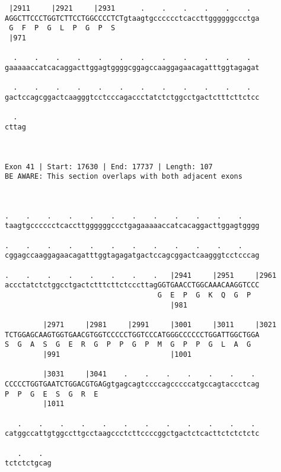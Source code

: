 \documentclass{article}
\begin{document}
\begin{Verbatim}
 |2911     |2921     |2931      .    .    .    .    .    .  
AGGCTTCCCTGGTCTTCCTGGCCCCTCTgtaagtgcccccctcaccttggggggccctga
 G  F  P  G  L  P  G  P  S                                  
 |971                                                       
  
  .    .    .    .    .    .    .    .    .    .    .    .  
gaaaaaccatcacaggacttggagtggggcggagccaaggagaacagatttggtagagat
                                                            
  .    .    .    .    .    .    .    .    .    .    .    .  
gactccagcggactcaagggtcctcccagaccctatctctggcctgactctttcttctcc
                                                            
  .  
cttag
     
     
 
Exon 41 | Start: 17630 | End: 17737 | Length: 107
BE AWARE: This section overlaps with both adjacent exons



.    .    .    .    .    .    .    .    .    .    .    .    
taagtgcccccctcaccttggggggccctgagaaaaaccatcacaggacttggagtgggg
                                                            
.    .    .    .    .    .    .    .    .    .    .    .    
cggagccaaggagaacagatttggtagagatgactccagcggactcaagggtcctcccag
                                                            
.    .    .    .    .    .    .    .   |2941     |2951     |2961
accctatctctggcctgactctttcttctcccttagGGTGAACCTGGCAAACAAGGTCCC
                                    G  E  P  G  K  Q  G  P  
                                       |981                 
  
         |2971     |2981     |2991     |3001     |3011     |3021
TCTGGAGCAAGTGGTGAACGTGGTCCCCCTGGTCCCATGGGCCCCCCTGGATTGGCTGGA
S  G  A  S  G  E  R  G  P  P  G  P  M  G  P  P  G  L  A  G  
         |991                          |1001                
  
         |3031     |3041    .    .    .    .    .    .    . 
CCCCCTGGTGAATCTGGACGTGAGgtgagcagtccccagcccccatgccagtaccctcag
P  P  G  E  S  G  R  E                                      
         |1011                                              
  
   .    .    .    .    .    .    .    .    .    .    .    . 
catggccattgtggccttgcctaagccctcttccccggctgactctcacttctctctctc
                                                            
   .    .  
tctctctgcag
           

\end{Verbatim}
\end{document}
